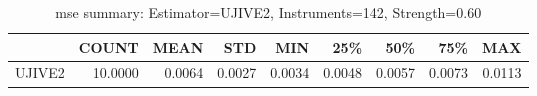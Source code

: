 \begin{table}[ht]
\centering
\caption{mse summary: Estimator=UJIVE2, Instruments=142, Strength=0.60}
\begin{tabular}{lrrrrrrrr}
\toprule
 & COUNT & MEAN & STD & MIN & 25\% & 50\% & 75\% & MAX \\
\midrule
UJIVE2 & 10.0000 & 0.0064 & 0.0027 & 0.0034 & 0.0048 & 0.0057 & 0.0073 & 0.0113 \\
\bottomrule
\end{tabular}
\end{table}

